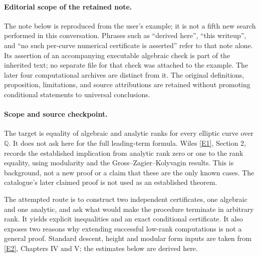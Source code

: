 \documentclass[11pt]{article}
\begin{document}
\paragraph{Editorial scope of the retained note.}
The note below is reproduced from the user's example; it is not a fifth new
search performed in this conversation. Phrases such as ``derived here'',
``this writeup'', and ``no such per-curve numerical certificate is asserted''
refer to that note alone. Its assertion of an accompanying executable algebraic
check is part of the inherited text; no separate file for that check was attached
to the example. The later four computational archives are distinct from it.
The original definitions, proposition, limitations, and source attributions are
retained without promoting conditional statements to universal conclusions.



\paragraph{Scope and source checkpoint.}
The target is equality of algebraic and analytic ranks for every elliptic
curve over $\mathbb Q$. It does not ask here for the full leading-term
formula. Wiles \href{https://www.claymath.org/wp-content/uploads/2022/05/birchswin.pdf}{[E1]}, Section 2, records the established implication from
analytic rank zero or one to the rank equality, using modularity and the
Gross--Zagier--Kolyvagin results. This is background, not a new proof or a
claim that these are the only known cases. The catalogue's later claimed
proof is not used as an established theorem.

The attempted route is to construct two independent certificates, one
algebraic and one analytic, and ask what would make the procedure terminate
in arbitrary rank. It yields explicit inequalities and an exact conditional
certificate. It also exposes two reasons why extending successful low-rank
computations is not a general proof. Standard descent, height and modular
form inputs are taken from \href{https://www.jmilne.org/math/Books/ectext6.pdf}{[E2]}, Chapters IV and V; the estimates below are
derived here.
\end{document}
